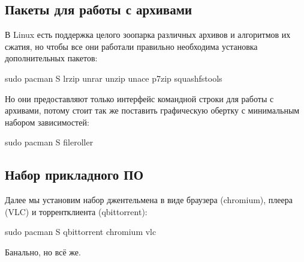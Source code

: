 \documentclass[letterpaper,10pt,russian,openany]{sphinxmanual}
\begin{document}
\ignorespaces 

\subsection{Пакеты для работы с архивами}
\label{\detokenize{source/first-steps:archive-packages}}\label{\detokenize{source/first-steps:index-6}}\label{\detokenize{source/first-steps:id6}}
\sphinxAtStartPar
В Linux есть поддержка целого зоопарка различных архивов и алгоритмов их сжатия, но
чтобы все они работали правильно необходима установка дополнительных пакетов:

\begin{sphinxVerbatim}[commandchars=\\\{\}]
sudo pacman \PYGZhy{}S lrzip unrar unzip unace p7zip squashfs\PYGZhy{}tools
\end{sphinxVerbatim}

\sphinxAtStartPar
Но они предоставляют только интерфейс командной строки для работы с архивами, потому
стоит так же поставить графическую обертку с минимальным набором зависимостей:

\begin{sphinxVerbatim}[commandchars=\\\{\}]
sudo pacman \PYGZhy{}S file\PYGZhy{}roller
\end{sphinxVerbatim}

\ignorespaces 

\subsection{Набор прикладного ПО}
\label{\detokenize{source/first-steps:applications-packages}}\label{\detokenize{source/first-steps:index-7}}\label{\detokenize{source/first-steps:id7}}
\sphinxAtStartPar
Далее мы установим набор джентельмена в виде браузера (chromium), плеера (VLC) и торрент\sphinxhyphen{}клиента (qbittorrent):

\begin{sphinxVerbatim}[commandchars=\\\{\}]
sudo pacman \PYGZhy{}S qbittorrent chromium vlc
\end{sphinxVerbatim}

\sphinxAtStartPar
Банально, но всё же.
\end{document}
